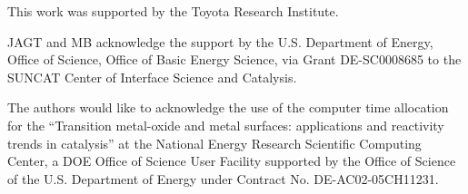 

This work was supported by the Toyota Research Institute.

JAGT and MB acknowledge the support by the U.S. Department of Energy, Office
of Science, Office of Basic Energy Science, via Grant DE-SC0008685 to the
SUNCAT Center of Interface Science and Catalysis.

The authors would like to acknowledge the use of the computer time allocation
for the “Transition metal-oxide and metal surfaces: applications and
reactivity trends in catalysis” at the National Energy Research Scientific
Computing Center, a DOE Office of Science User Facility supported by the
Office of Science of the U.S. Department of Energy under Contract No.
DE-AC02-05CH11231.
